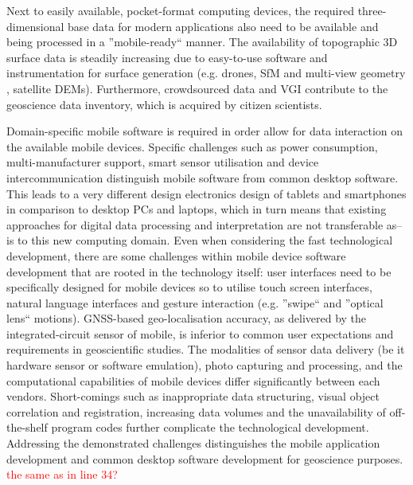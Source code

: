 \documentclass[review]{elsarticle}
\begin{document}
Next to easily available, pocket-format computing devices, the required three-dimensional base data for modern applications also need to be available and being processed in a ''mobile-ready`` manner. The availability of topographic 3D surface data is steadily increasing due to easy-to-use software and instrumentation for surface generation (e.g. drones, \gls{SfM} \cite{Wu2013} and multi-view geometry \cite{Goesele2007}, satellite \glspl{DEM}). Furthermore, crowdsourced data and \gls{VGI} contribute to the geoscience data inventory, which is acquired by citizen scientists. %


Domain-specific mobile software is required in order allow for data interaction on the available mobile devices. Specific challenges such as power consumption, multi-manufacturer support, smart sensor utilisation and device intercommunication distinguish mobile software from common desktop software. This leads to a very different design electronics design of tablets and smartphones in comparison to desktop PCs and laptops, which in turn means that existing approaches for digital data processing and interpretation are not transferable as--is to this new computing domain. Even when considering the fast technological development, there are some challenges within mobile device software development that are rooted in the technology itself: user interfaces need to be specifically designed for mobile devices so to utilise touch screen interfaces, natural language interfaces and gesture interaction (e.g. ''swipe`` and ''optical lens`` motions). \gls{GNSS}-based geo-localisation accuracy, as delivered by the integrated-circuit sensor of mobile, is inferior to common user expectations and requirements in geoscientific studies. The modalities of sensor data delivery (be it hardware sensor or software emulation), photo capturing and processing, and the computational capabilities of mobile devices differ significantly between each vendors. Short-comings such as inappropriate data structuring, visual object correlation and registration, increasing data volumes and the unavailability of off-the-shelf program codes further complicate the technological development. Addressing the demonstrated challenges distinguishes the mobile application development and common desktop software development for geoscience purposes. \textcolor{red}{the same as in line 34?}
\end{document}
